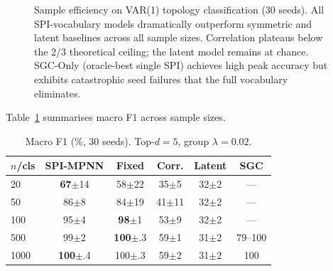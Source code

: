 \documentclass{article}
\theoremstyle{plain}
\begin{document}
\begin{figure}[t]
\vskip 0.2in
\begin{center}
\caption{Sample efficiency on VAR(1) topology classification (30 seeds). All SPI-vocabulary models dramatically outperform symmetric and latent baselines across all sample sizes. Correlation plateaus below the $2/3$ theoretical ceiling; the latent model remains at chance. SGC-Only (oracle-best single SPI) achieves high peak accuracy but exhibits catastrophic seed failures that the full vocabulary eliminates.}
\label{fig:sample_efficiency}
\end{center}
\vskip -0.2in
\end{figure}

Table~\ref{tab:main} summarises macro F1 across sample sizes.

\begin{table}[t]
\caption{Macro F1 (\%, 30 seeds). Top-$d{=}5$, group $\lambda{=}0.02$.}
\label{tab:main}
\vskip 0.1in
\begin{center}
\begin{small}
\begin{tabular}{lccccc}
\toprule
$n$/cls & SPI-MPNN & Fixed & Corr. & Latent & SGC \\
\midrule
20   & \textbf{67}{\scriptsize$\pm$14} & 58{\scriptsize$\pm$22} & 35{\scriptsize$\pm$5}  & 32{\scriptsize$\pm$2} & --- \\
50   & 86{\scriptsize$\pm$8}  & 84{\scriptsize$\pm$19} & 41{\scriptsize$\pm$11} & 32{\scriptsize$\pm$2} & --- \\
100  & 95{\scriptsize$\pm$4}  & \textbf{98}{\scriptsize$\pm$1}  & 53{\scriptsize$\pm$9}  & 32{\scriptsize$\pm$2} & --- \\
500  & 99{\scriptsize$\pm$2}  & \textbf{100}{\scriptsize$\pm$.3} & 59{\scriptsize$\pm$1}  & 31{\scriptsize$\pm$2} & 79--100 \\
1000 & \textbf{100}{\scriptsize$\pm$.4} & 100{\scriptsize$\pm$.3} & 59{\scriptsize$\pm$2}  & 31{\scriptsize$\pm$2} & 100 \\
\bottomrule
\end{tabular}
\end{small}
\end{center}
\vskip -0.15in
\end{table}
\end{document}
